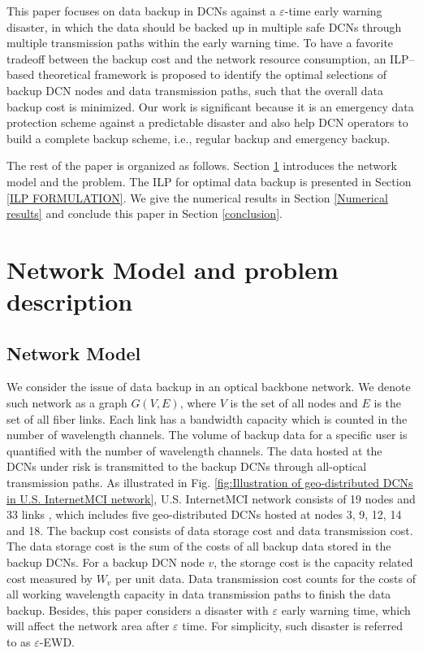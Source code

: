 \documentclass[conference]{IEEEtran}\IEEEoverridecommandlockouts
\begin{document}
This paper focuses  on  data backup in DCNs against a $\varepsilon$-time early warning disaster, in which the data should be backed up in multiple safe DCNs through multiple transmission paths  within the early warning time. To have a favorite tradeoff between the backup cost and the network resource consumption, an ILP--based theoretical framework is proposed to identify the optimal selections of backup DCN nodes and data transmission paths, such that the overall data backup cost is minimized. Our work is significant because it is an emergency data protection scheme against a predictable disaster and also help DCN operators to build a complete backup scheme, i.e., regular backup and emergency backup.



The rest of the paper is organized as follows. Section \ref{System Model and problem description} introduces the network model and the problem. The ILP for optimal data backup is presented in Section \ref{ILP FORMULATION}. We give the numerical results in Section \ref{Numerical results} and conclude this paper in Section \ref{conclusion}.

\section{Network Model and problem description}\label{System Model and problem description}
\subsection{Network Model }\label{System Model}
 We consider the issue of data backup in an optical backbone network. We denote such network as a graph $G(V,E)$, where $V$ is the set of all nodes and $E$ is the set of all fiber links.
Each link has a bandwidth capacity which is counted in the number of wavelength channels.
The volume of backup data for a specific user is quantified with the number of wavelength channels.
The data hosted at the DCNs  under risk is transmitted to  the backup DCNs  through all-optical transmission paths.
As illustrated in Fig. \ref{fig:Illustration of geo-distributed DCNs in U.S. InternetMCI network},  U.S. InternetMCI network  consists of 19 nodes and 33 links \cite{InternetMCI}, which includes five geo-distributed DCNs hosted at nodes 3, 9, 12, 14 and 18.
The backup cost consists of data storage cost and data transmission cost. The data storage cost is the sum of the costs of all backup data stored in the backup DCNs. For a backup DCN node $v$, the storage cost is the capacity related cost measured by $W_{v}$ per unit data. Data transmission cost counts for the costs of all working wavelength capacity in data transmission paths to finish the data backup. Besides, this paper considers a disaster with  $\varepsilon$ early warning time, which will affect the network area after $\varepsilon$ time. For simplicity, such disaster is referred to as  $\varepsilon$-EWD.
\end{document}
